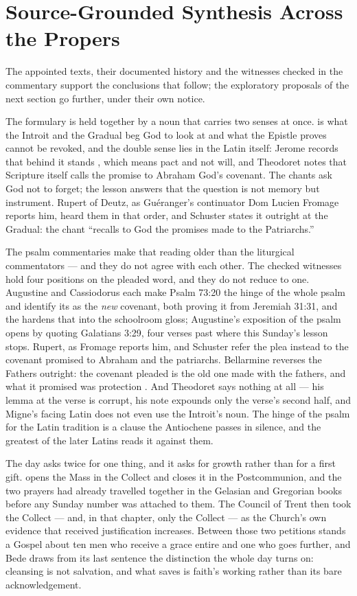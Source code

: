 \sectionguard
\section*{Source-Grounded Synthesis Across the Propers}

The appointed texts, their documented history and the witnesses checked in
the commentary support the conclusions that follow; the exploratory proposals
of the next section go further, under their own notice.

The formulary is held together by a noun that carries two senses at once.
 is what the Introit and the Gradual beg God to look at and
what the Epistle proves cannot be revoked, and the double sense lies in the
Latin itself: Jerome records that behind
it stands , which means pact and not will, and Theodoret notes
that Scripture itself calls the promise to Abraham God's covenant. The chants
ask God not to forget; the lesson answers that the question is not memory but
instrument. Rupert of Deutz, as Guéranger's continuator Dom Lucien Fromage
reports him, heard them in that order, and Schuster states it outright at the
Gradual: the chant ``recalls to God the promises made to the Patriarchs.''

The psalm commentaries make that reading older than the liturgical commentators
--- and they do not agree with each other. The checked witnesses hold four
positions on the pleaded word, and they do not reduce to one. Augustine and Cassiodorus each
make Psalm 73:20 the hinge of the whole psalm and identify its
 as the \emph{new} covenant, both proving it from Jeremiah
31:31, and the  hardens that into the schoolroom gloss;
Augustine's exposition of the psalm opens by quoting Galatians 3:29, four
verses past where this Sunday's lesson stops. Rupert, as Fromage reports him,
and Schuster refer the plea instead to the covenant promised to Abraham and the
patriarchs. Bellarmine reverses the Fathers outright: the covenant pleaded is
the old one made with the fathers, and what it promised was protection
. And Theodoret says nothing at all --- his
lemma at the verse is corrupt, his note expounds only the verse's second half,
and Migne's facing Latin does not even use the Introit's noun. The hinge of the
psalm for the Latin tradition is a clause the Antiochene passes in silence, and
the greatest of the later Latins reads it against them.

The day asks twice for one thing, and it asks for growth rather than for a
first gift.  opens the Mass in the Collect and closes it in
the Postcommunion, and the two prayers had already travelled together in the
Gelasian and Gregorian books before any Sunday number was attached to them.
The Council of Trent then took the Collect --- and, in that chapter, only the
Collect --- as the Church's own evidence that received justification
increases. Between those two petitions stands a Gospel about ten men who
receive a grace entire and one who goes further, and Bede draws from its last
sentence the distinction the whole day turns on: cleansing is not salvation,
and what saves is faith's working rather than its bare acknowledgement.

